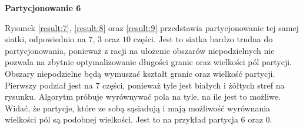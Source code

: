\vspace{3mm}
\textbf{Partycjonowanie 6}
\vspace{1mm}

Rysunek \ref{result:7}, \ref{result:8} oraz \ref{result:9} przedstawia partycjonowanie tej samej siatki, odpowiednio na
$7$, $3$ oraz $10$ części.
Jest to siatka bardzo trudna do partycjonowania, ponieważ z racji na ułożenie obszarów niepodzielnych
nie pozwala na zbytnie optymalizowanie długości granic oraz wielkości pól partycji.
Obszary niepodzielne będą wymuszać kształt granic oraz wielkość partycji.
Pierwszy podział jest na $7$ części, ponieważ tyle jest białych i żółtych stref na rysunku.
Algorytm próbuje wyrównywać pola na tyle, na ile jest to możliwe.
Widać, że partycje, które ze sobą sąsiadują i mają możliwość wyrównania wielkości pól są podobnej wielkości.
Jest to na przykład partycja $6$ oraz $0$.
